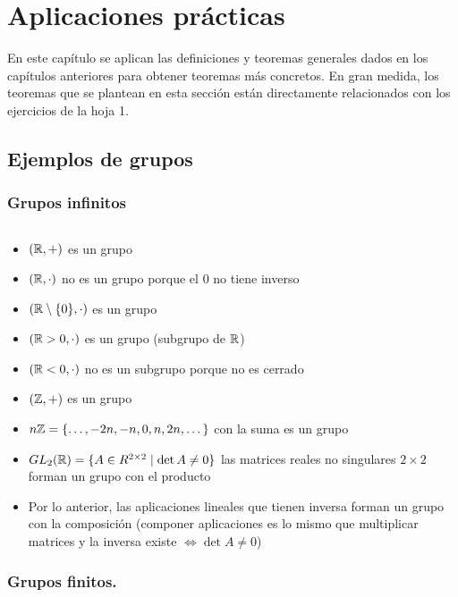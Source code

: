 
\chapter{Aplicaciones prácticas}

En este capítulo se aplican las definiciones y teoremas generales dados en los capítulos anteriores para obtener teoremas más concretos. En gran medida, los teoremas que se plantean en esta sección están directamente relacionados con los ejercicios de la hoja 1.

\section{Ejemplos de grupos}

\subsection{Grupos infinitos}

\begin{ej}$ $\newline
	\begin{itemize}
		\item $(\mathbb{R}, +)$ es un grupo
		\item $(\mathbb{R}, \cdot)$ no es un grupo porque el $0$ no tiene inverso
		\item $(\mathbb{R}\setminus\{0\}, \cdot)$ es un grupo
		\item $(\mathbb{R} > 0, \cdot)$ es un grupo (subgrupo de $\mathbb{R}$)
		\item $(\mathbb{R} < 0, \cdot)$ no es un subgrupo porque no es cerrado
		\item $(\mathbb{Z}, +)$ es un grupo
		\item $n\mathbb{Z} = \{\dots, -2n, -n, 0, n, 2n, \dots\}$ con la suma es un grupo
		\item $GL_2(\mathbb{R}) = \{A \in R^{2\times 2} \mid \det A \neq 0\}$ las matrices reales no singulares $2\times 2$ forman un grupo con el producto
		\item Por lo anterior, las aplicaciones lineales que tienen inversa forman un grupo con la composición (componer aplicaciones es lo mismo que multiplicar matrices y la inversa existe $\iff \det A \neq 0$)
	\end{itemize}
\end{ej}

\subsection{Grupos finitos.}

